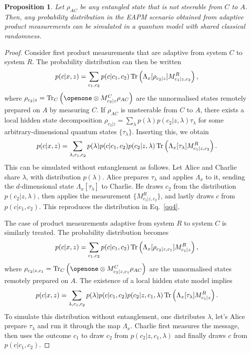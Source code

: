 \documentclass[aps,superscriptaddress,twocolumn,twoside,floatfix,pra,nofootinbib,a4paper]{revtex4-2}
\newtheorem{proposition}{Proposition}
\begin{document}
\begin{proposition}\label{prop2}
Let  $\rho_{AC}$ be any entangled state that is not steerable from $C$ to $A$. Then, any probability distribution in the EAPM scenario obtained from adaptive product measurements can be simulated in a quantum model with shared classical randomness.
\end{proposition}
\begin{proof}
Consider first product measurements that are adaptive from system $C$ to system $R$. The probability distribution can then be written 
\begin{equation}
p(c|x,z)=\sum_{c_1,c_2}p(c|c_1,c_2)\Tr\left(\Lambda_x[\rho_{c_2|z}]M^{R}_{c_1|z,c_2}\right),
\end{equation}
where $\rho_{c_2|z}=\Tr_C\left(\openone\otimes M^{C}_{c_2|z}\rho_{AC}\right)$ are the unnormalised states remotely prepared on $A$ by measuring $C$. If $\rho_{AC}$ is unsteerable from $C$ to $A$, there exists a  local hidden state decomposition $\rho_{c_2|z}=\sum_\lambda p(\lambda)p(c_2|z,\lambda)\tau_\lambda$ for some arbitrary-dimensional quantum states $\{\tau_\lambda\}$.  Inserting this, we obtain
\begin{equation}\label{qq4}
p(c|x,z)=\sum_{\lambda,c_1,c_2} p(\lambda)p(c|c_1,c_2) p(c_2|z,\lambda) \Tr\left(\Lambda_x[\tau_\lambda]M^{R}_{c_1|z,c_2}\right).
\end{equation}	
This can be simulated without entanglement as follows. Let Alice and Charlie share $\lambda$, with distribution $p(\lambda)$. Alice prepares $\tau_\lambda$ and  applies  $\Lambda_x$ to it, sending the  $d$-dimensional state $\Lambda_x[\tau_\lambda]$ to Charlie. He draws  $c_2$ from the distribution $p(c_2|z,\lambda)$, then  applies the measurement $\{M^{R}_{c_1|z,c_2}\}$, and lastly draws $c$ from $p(c|c_1,c_2)$.  This reproduces the distribution in Eq.~\eqref{qq4}.

The case of product measurements adaptive from system $R$ to system $C$ is similarly treated. The probability distribution becomes
\begin{equation}
p(c|x,z)=\sum_{c_1,c_2}p(c|c_1,c_2)\Tr\left(\Lambda_x[\rho_{c_2|z,c_1}]M^{R}_{c_1|z}\right),
\end{equation}
where $\rho_{c_2|z,c_1}=\Tr_C\left(\openone\otimes M^{C}_{c_2|z,c_1}\rho_{AC}\right)$ are the unnormalised states remotely prepared on $A$. The existence of a local hidden state model implies 
\begin{equation}
p(c|x,z)=\sum_{\lambda,c_1,c_2} p(\lambda)p(c|c_1,c_2) p(c_2|z,c_1,\lambda) \Tr\left(\Lambda_x[\tau_\lambda]M^{R}_{c_1|z}\right).
\end{equation}	
To simulate this distribution without entanglement, one distributes $\lambda$, let's Alice prepare $\tau_\lambda$ and run it through the map $\Lambda_x$. Charlie first measures the message, then uses the outcome $c_1$ to draw $c_2$ from $p(c_2|z,c_1,\lambda)$ and finally draws $c$ from $p(c|c_1,c_2)$.
\end{proof} 
\end{document}
